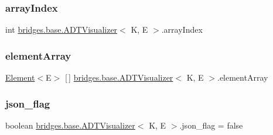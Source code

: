 \subsubsection{\texorpdfstring{array\+Index}{arrayIndex}}
{\footnotesize\ttfamily int \hyperlink{classbridges_1_1base_1_1_a_d_t_visualizer}{bridges.\+base.\+A\+D\+T\+Visualizer}$<$ K, E $>$.array\+Index\hspace{0.3cm}{\ttfamily [protected]}}

\hypertarget{classbridges_1_1base_1_1_a_d_t_visualizer_a320739b4be463d3987b3de2463b0d592}{}\label{classbridges_1_1base_1_1_a_d_t_visualizer_a320739b4be463d3987b3de2463b0d592} 
\subsubsection{\texorpdfstring{element\+Array}{elementArray}}
{\footnotesize\ttfamily \hyperlink{classbridges_1_1base_1_1_element}{Element}$<$E$>$ \mbox{[}$\,$\mbox{]} \hyperlink{classbridges_1_1base_1_1_a_d_t_visualizer}{bridges.\+base.\+A\+D\+T\+Visualizer}$<$ K, E $>$.element\+Array}

\hypertarget{classbridges_1_1base_1_1_a_d_t_visualizer_abf75be63a37f31ada7f92a84bb1bc536}{}\label{classbridges_1_1base_1_1_a_d_t_visualizer_abf75be63a37f31ada7f92a84bb1bc536} 
\subsubsection{\texorpdfstring{json\+\_\+flag}{json\_flag}}
{\footnotesize\ttfamily boolean \hyperlink{classbridges_1_1base_1_1_a_d_t_visualizer}{bridges.\+base.\+A\+D\+T\+Visualizer}$<$ K, E $>$.json\+\_\+flag = false\hspace{0.3cm}{\ttfamily [protected]}}

\hypertarget{classbridges_1_1base_1_1_a_d_t_visualizer_a288aece657b5641f48e839b34f3884b9}{}\label{classbridges_1_1base_1_1_a_d_t_visualizer_a288aece657b5641f48e839b34f3884b9} 
